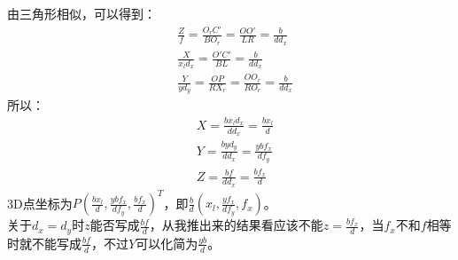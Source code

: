 \documentclass[UTF8]{ctexart}
\begin{document}
由三角形相似，可以得到：
\begin{align*}
&\frac{Z}{f}=\frac{O_rC'}{BO_r}=\frac{OO'}{LR}=\frac{b}{dd_x}\\
&\frac{X}{x_ld_x}=\frac{O'C'}{BL}=\frac{b}{dd_x}\\
&\frac{Y}{yd_y}=\frac{OP}{RX_r}=\frac{OO_r}{RO_r}=\frac{b}{dd_x}
\end{align*}
所以：
\begin{align}
&X=\frac{bx_ld_x}{dd_x}=\frac{bx_l}{d}\\
&Y=\frac{byd_y}{dd_x}=\frac{ybf_x}{df_y}\\
&Z=\frac{bf}{dd_x}=\frac{bf_x}{d}
\end{align}
3D点坐标为$P(\frac{bx_l}{d},\frac{ybf_x}{df_y},\frac{bf_x}{d})^T$，即$\frac{b}{d}(x_l,\frac{yf_x}{df_y},f_x)$。\\
关于$d_x=d_y$时$z$能否写成$\frac{bf}{d}$，从我推出来的结果看应该不能$z=\frac{bf_x}{d}$，当$f_x$不和$f$相等时就不能写成$\frac{bf}{d}$，不过$Y$可以化简为$\frac{yb}{d}$。
\end{document}
